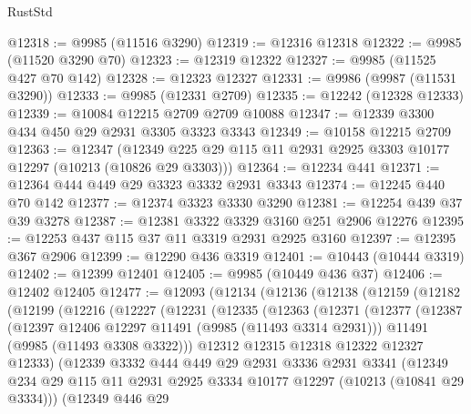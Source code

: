 \begin{lexlean}{RustStd}
\begin{coremodule}
@12318 := @9985 (@11516 @3290)
@12319 := @12316 @12318
@12322 := @9985 (@11520 @3290 @70)
@12323 := @12319 @12322
@12327 := @9985 (@11525 @427 @70 @142)
@12328 := @12323 @12327
@12331 := @9986 (@9987 (@11531 @3290))
@12333 := @9985 (@12331 @2709)
@12335 := @12242 (@12328 @12333)
@12339 := @10084 @12215 @2709 @2709 @10088
@12347 := @12339 @3300 @434 @450 @29 @2931 @3305 @3323 @3343
@12349 := @10158 @12215 @2709
@12363 := @12347
    (@12349 @225 @29 @115 @11 @2931 @2925 @3303 @10177 @12297 (@10213 (@10826 @29 @3303)))
@12364 := @12234 @441
@12371 := @12364 @444 @449 @29 @3323 @3332 @2931 @3343
@12374 := @12245 @440 @70 @142
@12377 := @12374 @3323 @3330 @3290
@12381 := @12254 @439 @37 @39 @3278
@12387 := @12381 @3322 @3329 @3160 @251 @2906 @12276
@12395 := @12253 @437 @115 @37 @11 @3319 @2931 @2925 @3160
@12397 := @12395 @367 @2906
@12399 := @12290 @436 @3319
@12401 := @10443 (@10444 @3319)
@12402 := @12399 @12401
@12405 := @9985 (@10449 @436 @37)
@12406 := @12402 @12405
@12477 := @12093
    (@12134
      (@12136
        (@12138
          (@12159
            (@12182
              (@12199
                (@12216
                  (@12227
                    (@12231
                      (@12335
                        (@12363
                          (@12371
                            (@12377
                              (@12387
                                (@12397 @12406 @12297 @11491 (@9985 (@11493 @3314 @2931)))
                                @11491
                                (@9985 (@11493 @3308 @3322)))
                              @12312
                              @12315
                              @12318
                              @12322
                              @12327
                              @12333)
                            (@12339
                              @3332
                              @444
                              @449
                              @29
                              @2931
                              @3336
                              @2931
                              @3341
                              (@12349
                                @234
                                @29
                                @115
                                @11
                                @2931
                                @2925
                                @3334
                                @10177
                                @12297
                                (@10213 (@10841 @29 @3334)))
                              (@12349
                                @446
                                @29

\end{coremodule}
\end{lexlean}
